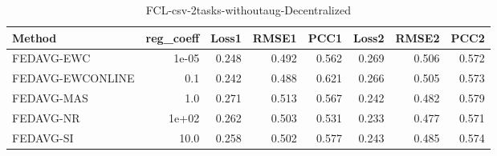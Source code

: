 \begin{table}
\caption{FCL-csv-2tasks-withoutaug-Decentralized}
\begin{tabular}{lrrrrrrr}
\toprule
Method & reg_coeff & Loss1 & RMSE1 & PCC1 & Loss2 & RMSE2 & PCC2 \\
\midrule
FEDAVG-EWC & 1e-05 & 0.248 & 0.492 & 0.562 & 0.269 & 0.506 & 0.572 \\
FEDAVG-EWCONLINE & 0.1 & 0.242 & 0.488 & 0.621 & 0.266 & 0.505 & 0.573 \\
FEDAVG-MAS & 1.0 & 0.271 & 0.513 & 0.567 & 0.242 & 0.482 & 0.579 \\
FEDAVG-NR & 1e+02 & 0.262 & 0.503 & 0.531 & 0.233 & 0.477 & 0.571 \\
FEDAVG-SI & 10.0 & 0.258 & 0.502 & 0.577 & 0.243 & 0.485 & 0.574 \\
\bottomrule
\end{tabular}
\end{table}
